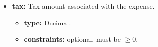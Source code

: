 \begin{itemize} [leftmargin=0.75cm, noitemsep, label=\textbullet]
    \begin{itemize} [leftmargin=0.75cm, noitemsep, label=$\circ$]

        \item \textbf{type:} ExpenseStatus Enum (Processing, PendingReview, Reviewed, Failed).

        \item \textbf{constraints:} mandatory, non-null.

    \end{itemize}

    \item \textbf{tax:} Tax amount associated with the expense.
    
    \begin{itemize} [leftmargin=0.75cm, noitemsep, label=$\circ$]

        \item \textbf{type:} Decimal.

        \item \textbf{constraints:} optional, must be $\geq 0$.

    \end{itemize}

\end{itemize}